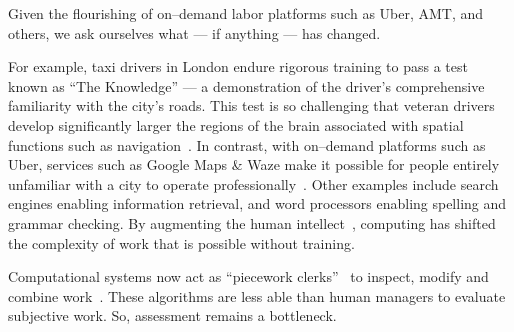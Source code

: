 \documentclass[trackingWork]{subfiles}
\begin{document}
Given the flourishing of on--demand labor platforms such as
Uber, AMT, and others, we ask ourselves
what --- if anything --- has changed.


For example, taxi drivers in London endure rigorous training to pass a test known as ``The Knowledge''
--- a demonstration of the driver's comprehensive familiarity with the city's roads.
This test is so challenging that veteran drivers develop significantly larger
the regions of the brain associated with spatial functions such as navigation~\cite{Maguire11042000,Maguire2894,Skok:1999:KML:299513.299625,skok2000managing,Woollett1407,woollett2011acquiring}.
In contrast, with on--demand platforms such as Uber, services such as Google Maps \& Waze make it possible for
people entirely unfamiliar with a city
to operate professionally~\cite{silva2013traffic,hind2014outsmarting}.
Other examples include search engines enabling information retrieval, and
word processors enabling spelling and grammar checking.
By augmenting the human intellect~\cite{engelbart2001augmenting},
computing has shifted the complexity of work that is possible without training.

Computational systems now %
act as ``piecework clerks''~\cite{10.2307/23702539} to inspect, modify and combine work~\cite{turkopticon,takingAHITMcInnis}.
These algorithms are less able than human managers to evaluate subjective work.
So, assessment remains a bottleneck.
\end{document}
